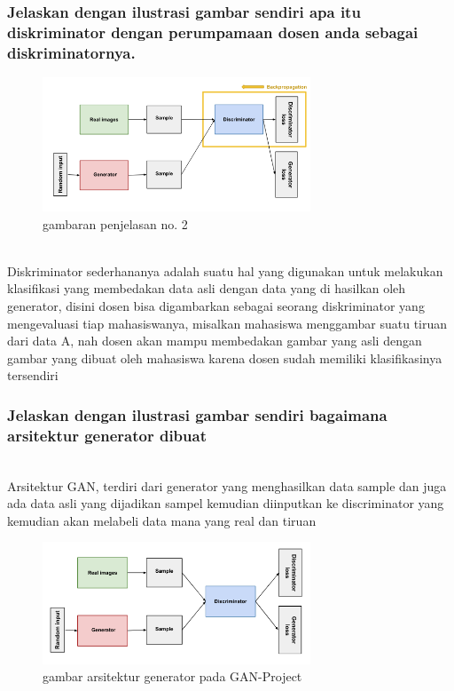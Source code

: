 \subsubsection{Jelaskan dengan ilustrasi gambar sendiri apa itu diskriminator dengan perumpamaan dosen anda sebagai diskriminatornya.}
\begin{figure}[H]
	\centering
	\includegraphics[width=8cm]{figures/1174079/8/discriminator.png}
	\caption{gambaran penjelasan no. 2}
\end{figure}
\hfill\\
Diskriminator sederhananya adalah suatu hal yang digunakan untuk melakukan klasifikasi yang membedakan data asli dengan data yang di hasilkan oleh generator, disini dosen bisa digambarkan sebagai seorang diskriminator yang mengevaluasi tiap mahasiswanya, misalkan mahasiswa menggambar suatu tiruan dari data A, nah dosen akan mampu membedakan gambar yang asli dengan gambar yang dibuat oleh mahasiswa karena dosen sudah memiliki klasifikasinya tersendiri


\subsubsection{Jelaskan dengan ilustrasi gambar sendiri bagaimana arsitektur generator dibuat}
\hfill\\
Arsitektur GAN, terdiri dari generator yang menghasilkan data sample dan juga ada data asli yang dijadikan sampel kemudian diinputkan ke discriminator yang kemudian akan melabeli data mana yang real dan tiruan
\begin{figure}[H]
	\centering
	\includegraphics[width=8cm]{figures/1174079/8/arsitektur_GAN.png}
	\caption{gambar arsitektur generator pada GAN-Project}
\end{figure}


